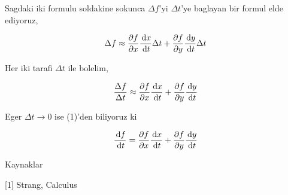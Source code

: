 \documentclass[12pt,fleqn]{article}\usepackage{../../common}
\begin{document}
Sagdaki iki formulu soldakine sokunca $\Delta f$'yi $\Delta t$'ye baglayan
bir formul elde ediyoruz,

$$
\Delta f \approx
\frac{\partial f}{\partial x} \frac{\,\mathrm{d} x}{\,\mathrm{d} t} \Delta t +
\frac{\partial f}{\partial y} \frac{\,\mathrm{d} y}{\,\mathrm{d} t} \Delta t
$$

Her iki tarafi $\Delta t$ ile bolelim,

$$
\frac{\Delta f}{\Delta t} \approx
\frac{\partial f}{\partial x} \frac{\,\mathrm{d} x}{\,\mathrm{d} t} +
\frac{\partial f}{\partial y} \frac{\,\mathrm{d} y}{\,\mathrm{d} t}
$$

Eger $\Delta t \to 0$ ise (1)'den biliyoruz ki 

$$
\frac{\,\mathrm{d} f}{\,\mathrm{d} t} =
\frac{\partial f}{\partial x} \frac{\,\mathrm{d} x}{\,\mathrm{d} t} +
\frac{\partial f}{\partial y} \frac{\,\mathrm{d} y}{\,\mathrm{d} t}
$$

Kaynaklar

[1] Strang, {Calculus}
\end{document}
